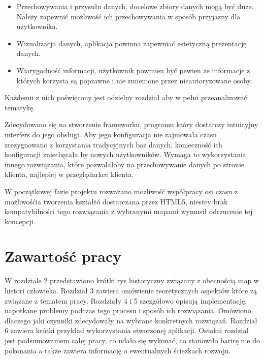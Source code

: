 \begin{itemize}

\item
Przechowywania i przysułu danych, docelowe zbiory danych mogą być duże. Należy zapewnić możliwość ich przechowywania w sposób przyjazny dla użytkownika.

\item
Wizualizacja danych, aplikacja powinna zapewniać estetyczną prezentację danych.

\item
Wiarygodność informacji, użytkownik powinien być pewien że informacje z których korzysta są poprawne i nie zmienione przez nieautoryzowane osoby.

\end{itemize} 

Każdemu z nich poświęcony jest odzielny rozdział aby w pełni przeanalizować tematykę.

Zdecydowano się na stworzenie frameworku, programu który dostarczy intuicyjny interfers do jego obsługi. Aby jego konfiguracja nie zajmowała czasu zrezygnowano z korzystania tradycyjnych baz danych, konieczność ich konfiguracji zniechęcała by nowych użytkowników. Wymaga to wykorzystania innego rozwiązania, które pozwalałoby na przechowywanie danych po stronie klienta, najlepiej w przeglądarkce klienta.

W początkowej fazie projektu rozważano możliwość współpracy osi czasu z możliwośćia tworzenia kształtó dostarczana przez HTML5, niestey brak kompatybilności tego rozwiązania z wybranymi mapami wymusił odrzucenie tej koncepcji.

\section{Zawartość pracy}
\label{sec:zawartoscPracy}


W rozdziale 2 przedstawiono krótki rys historyczny związany z obecnością map w histori człowieka. Rozdział 3 zawiera omówienie teoretycznych aspektów które zą związane z tematem pracy. Rozdziały 4 i 5 szczgółowo opisują implementację, napotkane problemy podczas tego procesu i sposób ich rozwiązania. Omówiono dlaczego jaki czynniki zdecydowały na wybrane konkretnych rozwiązań. Rozdział 6 zawiera krótki przykład wykorzystania stworzonej aplikacji. Ostatni rozdział jest podsumowaniem całej pracy, co udało się wykonać, co stanowiło barirę nie do pokonania a także zawiera informację o ewentualnych ścieżkach rozwoju.















